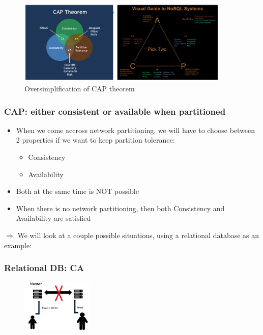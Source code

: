 \documentclass{article}
\begin{document}
\begin{figure}[H]
    \centering
    \includegraphics[width=0.9\textwidth]{cap-theoreum.png}
    \caption{Oversimplification of CAP theorem}
\end{figure}

\subsubsection{CAP: either consistent or available when partitioned}

\begin{itemize}
    \item When we come accross network partitioning, we will have to choose between 2 properties if we want to keep partition tolerance:
    \begin{itemize}
        \item Consistency
        \item Availability
    \end{itemize}
    \item Both at the same time is NOT possible
    \item When there is no network partitioning, then both Consistency and Availability are satisfied
\end{itemize}

$\Rightarrow$ We will look at a couple possible situations, using a relational database as an example:

\subsubsection{Relational DB: CA}

\begin{figure}[H]
    \centering
    \includegraphics[width=0.3\textwidth]{cap-theorem-ca.png}
\end{figure}
\end{document}
